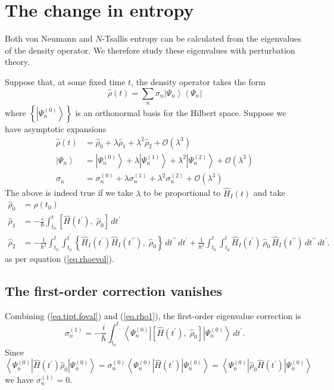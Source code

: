 \documentclass[11pt]{article}
\newcommand{\Od}[1]{\mathcal{O}{\left(#1\right)}}
\newcommand{\bra}[1]{\left\langle#1\right|}
\newcommand{\ket}[1]{\left|#1\right\rangle}
\newcommand{\op}[1]{\hat{#1}}
\theoremstyle{theorem}
\theoremstyle{remark}
\theoremstyle{step}
\theoremstyle{gap}
\begin{document}
\section{The change in entropy}

Both von Neumann and \(N\)-Tsallis entropy can be calculated from the eigenvalues of the density operator. We therefore study these eigenvalues with perturbation theory.

Suppose that, at some fixed time \(t\), the density operator takes the form
\begin{equation}\label{eq.densdecomp}
\op{\rho}(t) = \sum_n \sigma_n \ket{\Psi_n}\bra{\Psi_n}
\end{equation}
where \(\left\{\ket{\Psi_n^{(0)}}\right\}\) is an orthonormal basis for the Hilbert space.
Suppose we have asymptotic expansions
\begin{align*}
\op{\rho}(t) &= \op{\rho}_0 + \lambda \op{\rho}_1 + \lambda^2 \op{\rho}_2 + \Od{\lambda^3} \\
\ket{\Psi_n} &= \ket{\Psi_n^{(0)}} + \lambda \ket{\Psi_n^{(1)}} + \lambda^2 \ket{\Psi_n^{(2)}} + \Od{\lambda^3} \\
\sigma_n &= \sigma_n^{(0)} + \lambda \sigma_n^{(1)} + \lambda^2 \sigma_n^{(2)} + \Od{\lambda^3}
\end{align*}
The above is indeed true if we take \(\lambda\) to be proportional to \(\op{H}_I(t)\) and take
\begin{align}
\label{eq.rho0}\op{\rho}_0 &= \op{\rho}\left(t_0\right) \\
\label{eq.rho1}\op{\rho}_1 &= -\frac{i}{\hbar} \int_{t_0}^t \left[\op{H}(t^\prime),\; \op{\rho}_0 \right] \,dt^\prime\\
\label{eq.rho2}\op{\rho}_2 &= - \frac{1}{\hbar^2} \int_{t_0}^t \int_{t_0}^{t^\prime} \left\{ \op{H}_I (t^\prime) \op{H}_I(t^{\prime\prime}),\; \op{\rho}_0 \right\}\,dt^{\prime\prime}\,dt^\prime 
+ \frac{1}{\hbar^2} \int_{t_0}^t \int_{t_0}^{t} \op{H}_I (t^\prime) \,\op{\rho}_0\, \op{H}_I (t^{\prime\prime})\,dt^{\prime\prime}\,dt^\prime.
\end{align}
as per equation (\ref{eq.rhoevol}).

\subsection{The first-order correction vanishes}

Combining (\ref{eq.tipt.foval}) and (\ref{eq.rho1}), the first-order eigenvalue correction is
\[
\sigma_n^{(1)} = -\frac{i}{\hbar} \int_{t_0}^t \bra{\Psi_n^{(0)}} \left[\op{H}(t^\prime),\; \op{\rho}_0 \right] \ket{\Psi_n^{(0)}}\,dt^\prime.
\]
Since
\[
\bra{\Psi_n^{(0)}} \op{H}(t^\prime) \op{\rho}_0 \ket{\Psi_n^{(0)}} = 
\sigma_n^{(0)} \bra{\Psi_n^{(0)}} \op{H}(t^\prime) \ket{\Psi_n^{(0)}} =
\bra{\Psi_n^{(0)}} \op{\rho}_0 \op{H}(t^\prime) \ket{\Psi_n^{(0)}}
\]
we have \(\sigma_n^{(1)} = 0\).
\end{document}
